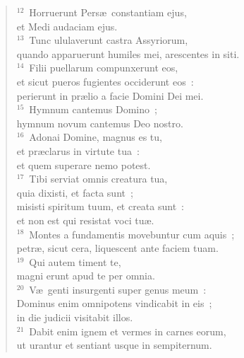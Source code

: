\begin{flushleft}
\begin{verse}
${}^{12}$~Horruerunt Pers\ae\ constantiam ejus,\\ et Medi audaciam ejus.\\
${}^{13}$~Tunc ululaverunt castra Assyriorum,\\ quando apparuerunt humiles mei, arescentes in siti.\\
${}^{14}$~Filii puellarum compunxerunt eos,\\ et sicut pueros fugientes occiderunt eos~:\\ perierunt in pr\ae lio a facie Domini Dei mei.\\
${}^{15}$~Hymnum cantemus Domino~;\\ hymnum novum cantemus Deo nostro.\\
${}^{16}$~Adonai Domine, magnus es tu,\\ et pr\ae clarus in virtute tua~:\\ et quem superare nemo potest.\\
${}^{17}$~Tibi serviat omnis creatura tua,\\ quia dixisti, et facta sunt~;\\ misisti spiritum tuum, et creata sunt~:\\ et non est qui resistat voci tu\ae .\\
${}^{18}$~Montes a fundamentis movebuntur cum aquis~;\\ petr\ae , sicut cera, liquescent ante faciem tuam.\\
${}^{19}$~Qui autem timent te,\\ magni erunt apud te per omnia.\\
${}^{20}$~V\ae\ genti insurgenti super genus meum~:\\ Dominus enim omnipotens vindicabit in eis~;\\ in die judicii visitabit illos.\\
${}^{21}$~Dabit enim ignem et vermes in carnes eorum,\\ ut urantur et sentiant usque in sempiternum.\end{verse}\end{flushleft}


